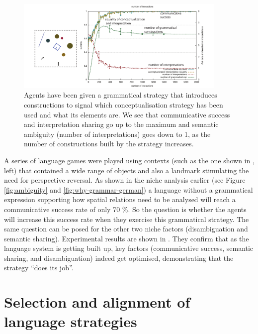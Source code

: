 \begin{figure}[htb!]
\centerline{
\includegraphics[width=0.9\textwidth]{chap12/figs/why-grammar-development-3.pdf}
}
\caption{{Agents have been given a grammatical strategy that introduces constructions to signal 
which conceptualisation strategy has been used and what its elements are. We see that communicative success and 
interpretation sharing go up to the maximum and semantic ambiguity (number of interpretations) goes down to 1, as 
the number of constructions built by the strategy increases. 
\label{fig:gramdev3}}
} 
\end{figure} 

A series of language games were played using contexts (such as the one shown in , left)
that contained a wide range of objects and also a landmark stimulating the need for perspective reversal. As shown in 
the niche analysis earlier (see Figure \ref{fig:ambiguity} and \ref{fig:why-grammar-german}) a language without 
a grammatical expression supporting how spatial relations need to be analysed will reach a 
communicative success rate of only 70 \%. So the question is whether the agents will increase this success rate when 
they exercise this grammatical strategy. The same question can be posed for the other two niche factors (disambiguation 
and semantic sharing). Experimental results are shown in . They confirm that as 
the language system is getting built up, key factors (communicative success, semantic sharing, and disambiguation) 
indeed get optimised, demonstrating that the strategy ``does its job''. 

\section{Selection and alignment of language strategies}

